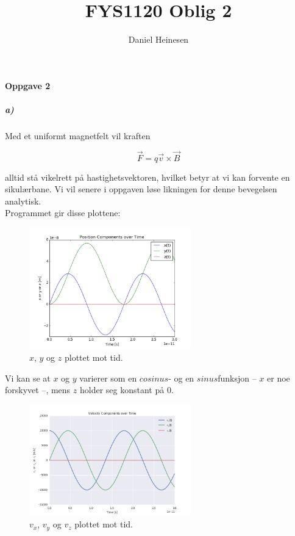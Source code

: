 \documentclass[a4paper,norsk, 10pt]{article}
\title{FYS1120 Oblig 2}
\author{Daniel Heinesen}
\begin{document}
\maketitle

\paragraph*{Oppgave 2}
\subparagraph*{a)}
Med et uniformt magnetfelt vil kraften

\begin{equation}
\vec{F} = q \vec{v}\times \vec{B}
\end{equation}

alltid stå vikelrett på hastighetsvektoren, hvilket betyr at vi kan forvente en sikulærbane. Vi vil senere i oppgaven løse likningen for denne bevegelsen analytisk.\\

Programmet gir disse plottene:

\begin{figure}[H]
\begin{center}
\includegraphics[width = 70mm]{opp2PosKomp2d.png}
\caption{$x$, $y$ og $z$ plottet mot tid.}
\end{center}
\end{figure}

Vi kan se at $x$ og $y$ varierer som en $cosinus$- og en $sinus$funksjon -- $x$ er noe forskyvet --, mens $z$ holder seg konstant på 0.

\begin{figure}[H]
\begin{center}
\includegraphics[width = 70mm]{opp2VelKomp2d.png}
\caption{$v_x$, $v_y$ og $v_z$ plottet mot tid.}
\end{center}
\end{figure}
\end{document}
